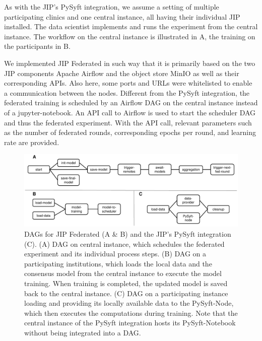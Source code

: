As with the JIP's PySyft integration, we assume a setting of multiple participating clinics and one central instance, all having their individual JIP installed. The data scientist implements and runs the experiment from the central instance.
The workflow on the central instance is illustrated in  A, the training on the participants in  B.

We implemented JIP Federated in such way that it is primarily based on the two JIP components Apache Airflow and the object store MinIO as well as their corresponding APIs. Also here, some ports and URLs were whitelisted to enable a communication between the nodes. Different from the PySyft integration, the federated training is scheduled by an Airflow DAG on the central instance instead of a jupyter-notebook. An API call to Airflow is used to start the scheduler DAG and thus the federated experiment. With the API call, relevant parameters such as the number of federated rounds, corresponding epochs per round, and learning rate are provided.

\begin{figure}[htbp]
    \centerline{\includegraphics[width=1\textwidth]{1_Figures/dags.pdf}}
    \caption[DAGs for JIP Federated and the JIP's PySyft integration]{DAGs for JIP Federated (A \& B) and the JIP's PySyft integration (C). (A) DAG on central instance, which schedules the federated experiment and its individual process steps. (B) DAG on a participating institutions, which loads the local data and the consensus model from the central instance to execute the model training. When training is completed, the updated model is saved back to the central instance.  (C) DAG on a participating instance loading and providing its locally available data to the PySyft-Node, which then executes the computations during training. Note that the central instance of the PySyft integration hosts its PySyft-Notebook without being integrated into a DAG.}
\label{fig:Dags}
\end{figure}

